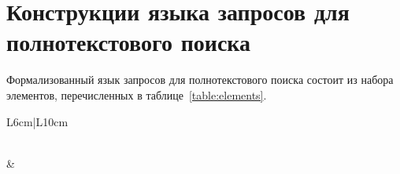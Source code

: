 \documentclass[russian,utf8,emptystyle]{eskdtext}
\newcounter{pageaux}
\begin{document}

\setcounter{pageaux}{1}
\setcounter{page}{174}
\tableofcontents

\clearpage
\section{Конструкции языка запросов для полнотекстового поиска}

Формализованный язык запросов для полнотекстового поиска состоит из набора элементов, перечисленных в таблице~\ref{table:elements}.

\begin{center}
\begin{longtable}{L{6cm}|L{10cm}}
\caption{Элементы языка полнотекстового поиска}
\label{table:elements} \\
 & 
 \\
\hline\hline
\endhead


\end{longtable}
\end{center}
\end{document}
